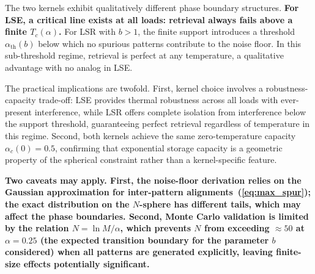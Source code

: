 \documentclass{article}
\theoremstyle{plain}
\theoremstyle{definition}
\theoremstyle{remark}
\begin{document}
The two kernels exhibit qualitatively different phase boundary structures. \textbf{For LSE, a critical line exists at all loads: retrieval always fails above a finite $T_c(\alpha)$.} For LSR with $b > 1$, the finite support introduces a threshold $\alpha_{\text{th}}(b)$ below which no spurious patterns contribute to the noise floor. In this sub-threshold regime, retrieval is perfect at any temperature, a qualitative advantage with no analog in LSE.

The practical implications are twofold. First, kernel choice involves a robustness-capacity trade-off: LSE provides thermal robustness across all loads with ever-present interference, while LSR offers complete isolation from interference below the support threshold, guaranteeing perfect retrieval regardless of temperature in this regime. Second, both kernels achieve the same zero-temperature capacity $\alpha_c(0) = 0.5$, confirming that exponential storage capacity is a geometric property of the spherical constraint rather than a kernel-specific feature.

\textbf{Two caveats may apply. First, the noise-floor derivation relies on the Gaussian approximation for inter-pattern alignments~(\ref{eq:max_spur}); the exact distribution on the $N$-sphere has different tails, which may affect the phase boundaries. Second, Monte Carlo validation is limited by the relation $N = \ln M/\alpha$, which prevents $N$ from exceeding $\approx 50$ at $\alpha = 0.25$ (the expected transition boundary for the parameter $b$ considered) when all patterns are generated explicitly, leaving finite-size effects potentially significant.}





\end{document}
